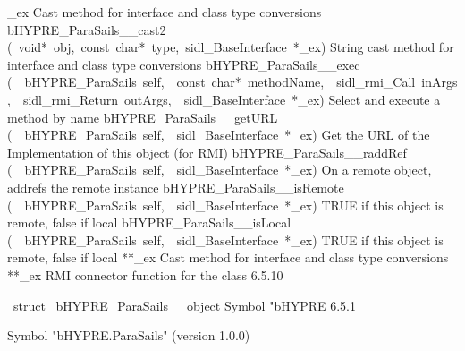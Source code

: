\documentclass{article}
\begin{document}
\begin{cxxentry}
\begin{cxxentry}
\begin{cxxnames}
        {\_ex}
        {}
        {
Cast method for interface and class type conversions}
        {}
\label{cxx.6.5.29}
        {bHYPRE\_ParaSails\_\_cast2}
        {(\ void*\ obj,\ const\ char*\ type,\ sidl\_BaseInterface\ *\_ex)}
        {
String cast method for interface and class type conversions}
        {}
\label{cxx.6.5.30}
        {bHYPRE\_ParaSails\_\_exec}
        {(\ \ bHYPRE\_ParaSails\ self,\ \ const\ char*\ methodName,\ \ sidl\_rmi\_Call\ inArgs,\ \ sidl\_rmi\_Return\ outArgs,\ \ sidl\_BaseInterface\ *\_ex)}
        {
Select and execute a method by name}
        {}
\label{cxx.6.5.31}
        {bHYPRE\_ParaSails\_\_getURL}
        {(\ \ bHYPRE\_ParaSails\ self,\ \ sidl\_BaseInterface\ *\_ex)}
        {
Get the URL of the Implementation of this object (for RMI)}
        {}
\label{cxx.6.5.32}
        {bHYPRE\_ParaSails\_\_raddRef}
        {(\ \ bHYPRE\_ParaSails\ self,\ \ sidl\_BaseInterface\ *\_ex)}
        {
On a remote object, addrefs the remote instance}
        {}
\label{cxx.6.5.33}
        {bHYPRE\_ParaSails\_\_isRemote}
        {(\ \ bHYPRE\_ParaSails\ self,\ \ sidl\_BaseInterface\ *\_ex)}
        {
TRUE if this object is remote, false if local}
        {}
\label{cxx.6.5.34}
        {bHYPRE\_ParaSails\_\_isLocal}
        {(\ \ bHYPRE\_ParaSails\ self,\ \ sidl\_BaseInterface\ *\_ex)}
        {
TRUE if this object is remote, false if local}
        {}
\label{cxx.6.5.35}
        {**\_ex}
        {}
        {
Cast method for interface and class type conversions}
        {}
\label{cxx.6.5.36}
        {**\_ex}
        {}
        {
RMI connector function for the class}
        {6.5.10}
\end{cxxnames}
\begin{cxxvariable}
{\ struct\ }
        {bHYPRE\_ParaSails\_\_object}
        {}
        {
Symbol "bHYPRE}
        {6.5.1}
\begin{cxxdoc}

Symbol "bHYPRE.ParaSails" (version 1.0.0)


\end{cxxdoc}
\end{cxxvariable}
\end{cxxentry}
\end{cxxentry}
\end{document}
